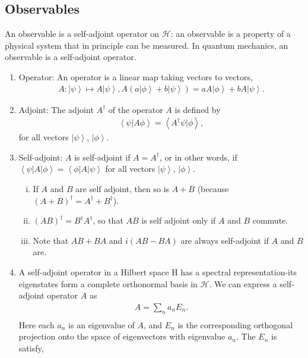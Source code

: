 \documentclass[onecolumn,pra,superscriptaddress,nofootinbib]{revtex4-1}
\newcommand{\bra}[1]{\mbox{$\left\langle #1 \right|$}}
\newcommand{\ket}[1]{\mbox{$\left| #1 \right\rangle$}}
\newcommand{\braket}[2]{\mbox{$\left\langle #1 | #2 \right\rangle$}}
\begin{document}
\subsection{Observables}
An observable is a self-adjoint operator on $\mathcal{H}$:
an observable is a property of a physical system that in principle can be measured. In quantum mechanics,
an observable is a self-adjoint operator.
\begin{enumerate}
\item
Operator: An operator is a linear map taking vectors to vectors,
\begin{equation} \label{operator}
\begin{aligned}
A:\ket{\psi}\mapsto A\ket{\psi},A(a\ket{\phi}+b\ket{\psi})=aA\ket{\phi}+bA\ket{\psi}.
\end{aligned}
\end{equation}

\item
Adjoint: The adjoint $A^\dag$ of the operator $A$ is defined by
\begin{equation} \label{adjoint}
\begin{aligned}
\braket{\psi}{A\phi}=\braket{A^\dag\psi}{\phi},
\end{aligned}
\end{equation}
for all vectors $\ket{\psi}$, $\ket{\phi}$.

\item
Self-adjoint: $A$ is self-adjoint if $A = A^\dag$, or in other words, if $\bra{\psi}A\ket{\phi}=\bra{\phi}A\ket{\psi}$ for all vectors $\ket{\psi}$, $\ket{\phi}$.
\begin{enumerate}[i)]
\item If $A$ and $B$ are self adjoint, then so is $A+B$ (because $(A + B)^\dag = A^\dag + B^\dag$).
\item $(AB)^\dag = B^\dag A^\dag$, so that $AB$ is self adjoint only if $A$ and $B$ commute.
\item Note that $AB + BA$ and $i(AB - BA)$ are
always self-adjoint if $A$ and $B$ are.
\end{enumerate}

\item
A self-adjoint operator in a Hilbert space H has a spectral representation-its eigenstates form a complete orthonormal basis in $\mathcal{H}$.
We can express a self-adjoint operator $A$ as
\begin{equation} \label{self-adjoint operator}
\begin{aligned}
A=\sum_{n}a_nE_n.\\
\end{aligned}
\end{equation}
Here each $a_n$ is an eigenvalue of $A$, and $E_n$ is the corresponding orthogonal projection onto the space of eigenvectors with eigenvalue $a_n$. The
$E_n$ is satisfy,


\end{enumerate}
\end{document}
